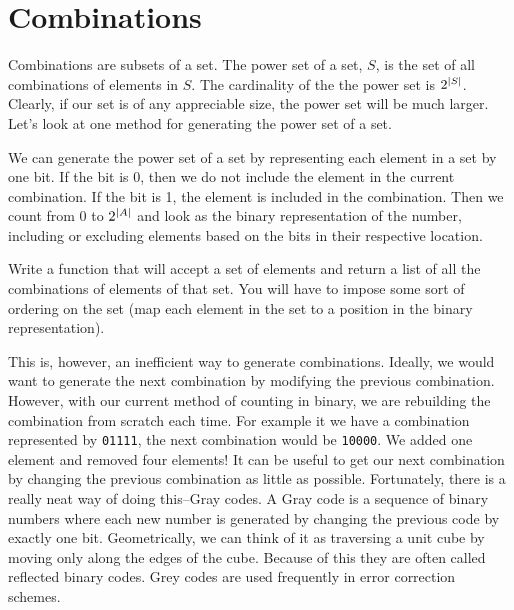 \section*{Combinations}
Combinations are subsets of a set.  The power set of a set, $S$, is the set of all combinations
of elements in $S$.  The cardinality of the the power set is $2^{\left\lvert S\right\rvert}$.  Clearly, if our
set is of any appreciable size, the power set will be much larger.  Let's look at one method for
generating the power set of a set.

We can generate the power set of a set by representing each element in a set by one bit.
If the bit is 0, then we do not include the element in the current combination.  If the
bit is 1, the element is included in the combination.  Then we count from 0 to $2^{\left\lvert A\right\rvert}$
and look as the binary representation of the number, including or excluding elements based
on the bits in their respective location.

\begin{problem}
Write a function that will accept a set of elements and return a list of all the combinations
of elements of that set.  You will have to impose some sort of ordering on the set (map each element
in the set to a position in the binary representation).
\end{problem}

This is, however, an inefficient way to generate combinations.  Ideally, we would want
to generate the next combination by modifying the previous combination.  However, with
our current method of counting in binary, we are rebuilding the combination from scratch
each time.  For example it we have a combination represented by \texttt{01111}, the next
combination would be \texttt{10000}.  We added one element and removed four elements!
It can be useful to get our next combination by changing the previous combination as little as possible.
Fortunately, there is a really neat way of doing this--Gray codes. 
A Gray code is a sequence of binary numbers where each new number is generated by
changing the previous code by exactly one bit.  Geometrically, we can think of it as
traversing a unit cube by moving only along the edges of the cube.
Because of this they are often called reflected binary codes.
Grey codes are used frequently in error correction schemes.

